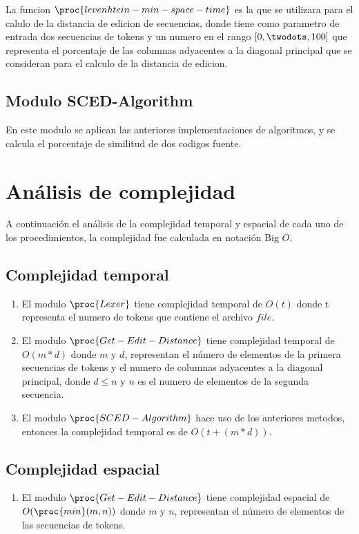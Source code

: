 La funcion $\proc{levenhtein-min-space-time}$ es la que se utilizara para el calulo de la distancia de edicion de secuencias, donde tiene como parametro de entrada dos secuencias de tokens y un numero  en el rango $[0, \twodots, 100]$ que representa el porcentaje de las columnas adyacentes a la diagonal principal que se consideran para el calculo de la distancia de edicion.

\subsection{Modulo SCED-Algorithm}
En este modulo se aplican las anteriores implementaciones de algoritmos, y se calcula el porcentaje de similitud de dos codigos fuente.


\section{Análisis de complejidad}
A continuación el análisis de la complejidad temporal y espacial de cada uno de los procedimientos, la complejidad fue calculada en notación Big $O$.
\subsection{Complejidad temporal}
\begin{enumerate}
  \item El modulo $\proc{Lexer}$ tiene complejidad temporal de $O(t)$ donde t representa el numero de tokens que contiene el archivo $file$.
  \item El modulo $\proc{Get-Edit-Distance}$ tiene complejidad temporal de $O(m*d)$ donde $m$ y $d$, representan el número de elementos de la primera secuencias de tokens y el numero de columnas adyacentes a la diagonal principal, donde $d \leq n$ y $n$ es el numero de elementos de la segunda secuencia.
  \item El modulo $\proc{SCED-Algorithm}$ hace uso de los anteriores metodos, entonces la complejidad temporal es de $O(t + (m*d))$.
\end{enumerate}
\subsection{Complejidad espacial}
\begin{enumerate}
  \item El modulo $\proc{Get-Edit-Distance}$ tiene complejidad espacial de $O(\proc{min}(m,n))$ donde $m$ y $n$, representan el número de elementos de las secuencias de tokens.
\end{enumerate}
